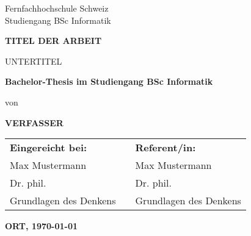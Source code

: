 \begin{titlepage}


    \begin{minipage}[t]{0.5\textwidth}\vspace{0pt}
        
    \end{minipage}
    \begin{minipage}[t]{0.43\textwidth}\vspace{2.3pt}
        \begin{flushright}
            Fernfachhochschule Schweiz\\
            Studiengang BSc Informatik\\
        \end{flushright}
    \end{minipage}
    \begin{center}
    
        \vfill
            
        \Huge
        \textbf{TITEL DER ARBEIT}
            
        \vspace{0.5cm}
        \LARGE
        UNTERTITEL
            
        \vfill
                        
        \textbf{Bachelor-Thesis im Studiengang BSc Informatik}
        
        \vspace{0.5cm}
        von
        \vspace{0.5cm}
                
        \textbf{VERFASSER}
            
        \vspace{2cm}
        \normalsize
               
        \begin{tabularx}{0.65\textwidth}{@{}l C l@{}} 
            \textbf{Eingereicht bei:}   & & \textbf{Referent/in:} \\ 
            Max Mustermann              & & Max Mustermann \\
            Dr. phil.                   & & Dr. phil. \\
            Grundlagen des Denkens      & & Grundlagen des Denkens \\
        \end{tabularx}
                
        \vspace{2cm}
            
            
        \textbf{ORT, \today}
        
        \vfill
    \end{center}
\end{titlepage}